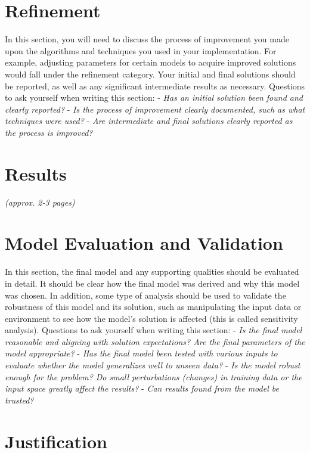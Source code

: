 \documentclass[]{report}
\begin{document}
\chapter{Refinement}

In this section, you will need to discuss the process of improvement you
made upon the algorithms and techniques you used in your implementation.
For example, adjusting parameters for certain models to acquire improved
solutions would fall under the refinement category. Your initial and
final solutions should be reported, as well as any significant
intermediate results as necessary. Questions to ask yourself when
writing this section: - \emph{Has an initial solution been found and
clearly reported?} - \emph{Is the process of improvement clearly
documented, such as what techniques were used?} - \emph{Are intermediate
and final solutions clearly reported as the process is improved?}

\chapter{Results}

\emph{(approx. 2-3 pages)}

\chapter{Model Evaluation and
Validation}\label{model-evaluation-and-validation}

In this section, the final model and any supporting qualities should be
evaluated in detail. It should be clear how the final model was derived
and why this model was chosen. In addition, some type of analysis should
be used to validate the robustness of this model and its solution, such
as manipulating the input data or environment to see how the model's
solution is affected (this is called sensitivity analysis). Questions to
ask yourself when writing this section: - \emph{Is the final model
reasonable and aligning with solution expectations? Are the final
parameters of the model appropriate?} - \emph{Has the final model been
tested with various inputs to evaluate whether the model generalizes
well to unseen data?} - \emph{Is the model robust enough for the
problem? Do small perturbations (changes) in training data or the input
space greatly affect the results?} - \emph{Can results found from the
model be trusted?}

\chapter{Justification}\label{justification}
\end{document}
